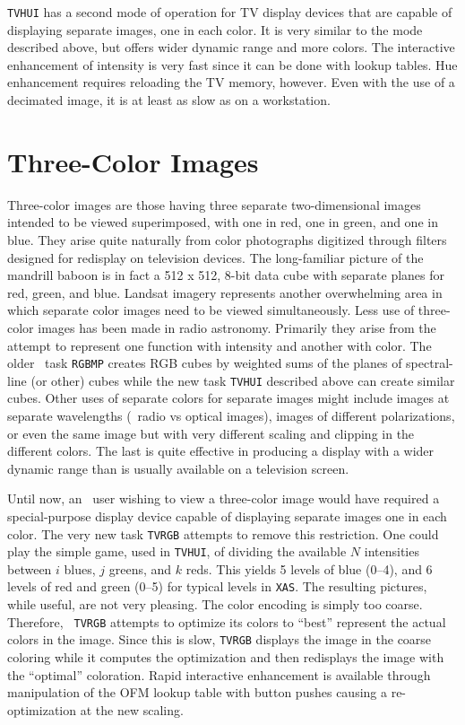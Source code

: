{\tt TVHUI} has a second mode of operation for TV display devices that
are capable of displaying separate images, one in each color.  It is
very similar to the mode described above, but offers wider dynamic
range and more colors.  The interactive enhancement of intensity is
very fast since it can be done with lookup tables.  Hue enhancement
requires reloading the TV memory, however.  Even with the use of a
decimated image, it is at least as slow as on a workstation.

\section{Three-Color Images}

Three-color images are those having three separate two-dimensional
images intended to be viewed superimposed, with one in red, one in
green, and one in blue.  They arise quite naturally from color
photographs digitized through filters designed for redisplay on
television devices.  The long-familiar picture of the mandrill baboon
is in fact a 512 x 512, 8-bit data cube with separate planes for red,
green, and blue.  Landsat imagery represents another overwhelming area
in which separate color images need to be viewed simultaneously.  Less
use of three-color images has been made in radio astronomy.  Primarily
they arise from the attempt to represent one function with intensity
and another with color.  The older \AIPS\ task {\tt RGBMP} creates RGB
cubes by weighted sums of the planes of spectral-line (or other) cubes
while the new task {\tt TVHUI} described above can create similar
cubes.  Other uses of separate colors for separate images might
include images at separate wavelengths (\eg\ radio vs optical images),
images of different polarizations, or even the same image but with
very different scaling and clipping in the different colors.  The last
is quite effective in producing a display with a wider dynamic range
than is usually available on a television screen.

Until now, an \AIPS\ user wishing to view a three-color image would
have required a special-purpose display device capable of displaying
separate images one in each color.  The very new task {\tt TVRGB}
attempts to remove this restriction.  One could play the simple game,
used in {\tt TVHUI}, of dividing the available $N$ intensities between
$i$ blues, $j$ greens, and $k$ reds.  This yields 5 levels of blue
(0--4), and 6 levels of red and green (0--5) for typical levels in
\hbox{{\tt XAS}}.  The resulting pictures, while useful, are not very
pleasing.  The color encoding is simply too coarse.  Therefore, {\tt
TVRGB} attempts to optimize its colors to ``best'' represent the
actual colors in the image.  Since this is slow, {\tt TVRGB} displays
the image in the coarse coloring while it computes the optimization
and then redisplays the image with the ``optimal'' coloration.  Rapid
interactive enhancement is available through manipulation of the OFM
lookup table with button pushes causing a re-optimization at the new
scaling.

